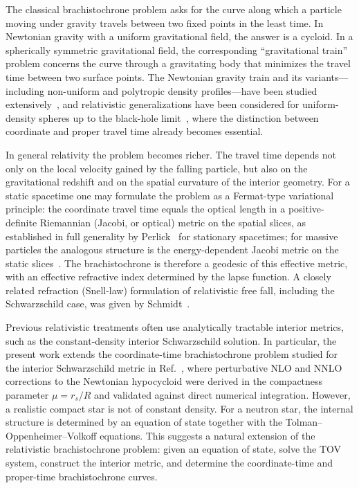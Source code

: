 \documentclass[
  aps,
  prd,
  twocolumn,
  nofootinbib,
  superscriptaddress,
  longbibliography
]{revtex4-2}
\begin{document}
The classical brachistochrone problem asks for the curve along which a
particle moving under gravity travels between two fixed points in the
least time. In Newtonian gravity with a uniform gravitational field,
the answer is a cycloid. In a spherically symmetric gravitational
field, the corresponding ``gravitational train'' problem concerns the
curve through a gravitating body that minimizes the travel time between
two surface points. The Newtonian gravity train and its
variants---including non-uniform and polytropic density
profiles---have been studied extensively~\cite{Klotz2015,GjerlovPesnell2019},
and relativistic generalizations have been considered for
uniform-density spheres up to the black-hole limit~\cite{Parker2017,Seel2018},
where the distinction between coordinate and proper travel time already
becomes essential.

In general relativity the problem becomes richer. The travel time
depends not only on the local velocity gained by the falling particle,
but also on the gravitational redshift and on the spatial curvature of
the interior geometry. For a static spacetime one may formulate the
problem as a Fermat-type variational principle: the coordinate travel
time equals the optical length in a positive-definite Riemannian
(Jacobi, or optical) metric on the spatial slices, as established in
full generality by Perlick~\cite{Perlick1990} for stationary
spacetimes; for massive particles the analogous structure is the
energy-dependent Jacobi metric on the static slices~\cite{Gibbons2016}.
The brachistochrone is therefore a geodesic of this effective metric,
with an effective refractive index determined by the lapse function. A
closely related refraction (Snell-law) formulation of relativistic free
fall, including the Schwarzschild case, was given by
Schmidt~\cite{Schmidt2018}.

Previous relativistic treatments often use analytically tractable
interior metrics, such as the constant-density interior Schwarzschild
solution. In particular, the present work extends the coordinate-time
brachistochrone problem studied for the interior Schwarzschild metric
in Ref.~\cite{Rosignoli2026}, where perturbative NLO and NNLO
corrections to the Newtonian hypocycloid were derived in the
compactness parameter $\mu=r_s/R$ and validated against direct
numerical integration. However, a realistic compact star is not of
constant density. For a neutron star, the internal structure is
determined by an equation of state together with the
Tolman--Oppenheimer--Volkoff equations. This suggests a natural
extension of the relativistic brachistochrone problem: given an
equation of state, solve the TOV system, construct the interior metric,
and determine the coordinate-time and proper-time brachistochrone
curves.
\end{document}

